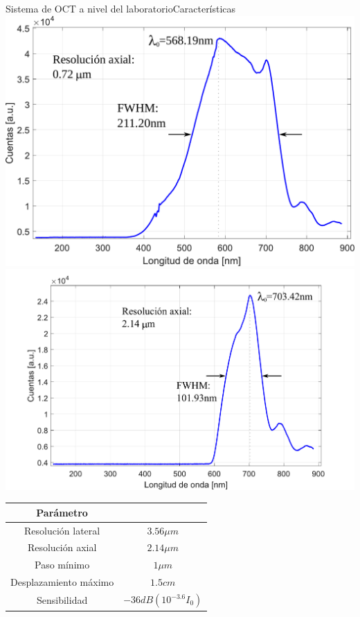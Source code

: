 \documentclass[fleqn,10pt]{beamer}
\begin{document}
\begin{frame}{Sistema de OCT a nivel del laboratorio}{Características}
	\includegraphics[width=0.42\linewidth]{AAUgraphics/pt2/src_spectrum}
	\includegraphics[width=0.49\linewidth]{AAUgraphics/pt2/filt_spectrum}
	\begin{table}
		\begin{tabular}{|c|c|}
			\hline
			\textbf{Parámetro}    &                       \\ 
			\hline
			Resolución lateral    & $3.56\mu m$           \\ 
			\hline
			Resolución axial      & $2.14\mu m$           \\ 
			\hline
			Paso mínimo           & $1\mu m$              \\
			\hline
			Desplazamiento máximo & $1.5cm$               \\ 
			\hline
			Sensibilidad           & $-36dB(10^{-3.6}I_0)$ \\
			\hline
		\end{tabular} 
	\end{table}
\end{frame}
\end{document}
